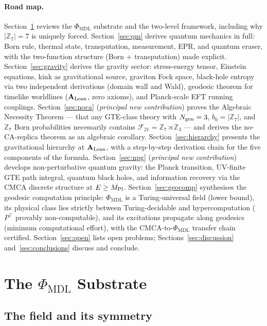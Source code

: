 \documentclass[11pt]{article}
\theoremstyle{remark}
\newcommand{\PHIMDL}{\Phi_{\mathrm{MDL}}}
\newcommand{\ZS}{\mathbb{Z}_7}
\newcommand{\ZZ}{\mathbb{Z}}
\newcommand{\FTT}{\mathcal{F}_{21}}
\newcommand{\CatAL}{\ensuremath{\textbf{A}_{\rm Lean}}}
\begin{document}
\medskip

\paragraph{Road map.}
Section~\ref{sec:substrate} reviews the $\PHIMDL$ substrate and the
two-level framework, including why $|\ZS|=7$ is uniquely forced.
Section~\ref{sec:qm} derives quantum mechanics in full:
Born rule, thermal state, transputation, measurement, EPR, and quantum eraser,
with the two-function structure (Born + transputation) made explicit.
Section~\ref{sec:gravity} derives the gravity sector: stress-energy tensor,
Einstein equations, kink as gravitational source, graviton Fock space,
black-hole entropy via two independent derivations (domain wall and Wald),
geodesic theorem for timelike worldlines ($\CatAL$, zero axioms), and
Planck-scale EFT running couplings.
Section~\ref{sec:noca} (\textit{principal new contribution}) proves the
Algebraic Necessity Theorem --- that any GTE-class theory with $N_{\rm gen}=3$,
$b_0=|\ZS|$, and $\ZS$ Born probabilities necessarily contains
$\FTT = \ZS\rtimes\ZZ_3$ --- and derives the no-CA-replica theorem as an
algebraic corollary.
Section~\ref{sec:hierarchy} presents the gravitational hierarchy at $\CatAL$,
with a step-by-step derivation chain for the five components of the formula.
Section~\ref{sec:npg} (\textit{principal new contribution}) develops
non-perturbative quantum gravity: the Planck transition, UV-finite GTE path
integral, quantum black holes, and information recovery via the CMCA discrete
structure at $E \geq M_{\rm Pl}$.
Section~\ref{sec:geocomp} synthesises the geodesic computation principle:
$\PHIMDL$ is a Turing-universal field (lower bound), its physical class lies
strictly between Turing-decidable and hypercomputation ($P^\top$ provably
non-computable), and its excitations propagate along geodesics (minimum
computational effort), with the CMCA-to-$\PHIMDL$ transfer chain certified.
Section~\ref{sec:open} lists open problems; Sections~\ref{sec:discussion}
and~\ref{sec:conclusions} discuss and conclude.

\section{The \texorpdfstring{$\PHIMDL$}{Phi-MDL} Substrate}
\label{sec:substrate}

\subsection{The field and its symmetry}
\end{document}
